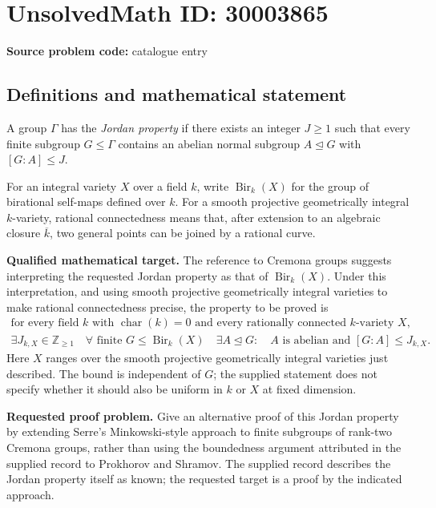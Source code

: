 \documentclass[11pt]{article}
\newcommand{\Z}{\mathbb{Z}}
\begin{document}
\section*{UnsolvedMath ID: 30003865}
\textbf{Source problem code:} catalogue entry
\subsection{Definitions and mathematical statement}
A group \(\Gamma\) has the \emph{Jordan property} if there exists an integer \(J\geq 1\) such that every finite subgroup \(G\leq\Gamma\) contains an abelian normal subgroup \(A\trianglelefteq G\) with \([G:A]\leq J\).

For an integral variety \(X\) over a field \(k\), write \(\operatorname{Bir}_k(X)\) for the group of birational self-maps defined over \(k\). For a smooth projective geometrically integral \(k\)-variety, rational connectedness means that, after extension to an algebraic closure \(\overline{k}\), two general points can be joined by a rational curve.

\textbf{Qualified mathematical target.} The reference to Cremona groups suggests interpreting the requested Jordan property as that of \(\operatorname{Bir}_k(X)\). Under this interpretation, and using smooth projective geometrically integral varieties to make rational connectedness precise, the property to be proved is
\[
\begin{gathered}
\text{for every field }k\text{ with }\operatorname{char}(k)=0
\text{ and every rationally connected }k\text{-variety }X,\\
\exists J_{k,X}\in\Z_{\geq1}\quad
\forall\text{ finite }G\leq\operatorname{Bir}_k(X)\quad
\exists A\trianglelefteq G:\quad
A\text{ is abelian and }[G:A]\leq J_{k,X}.
\end{gathered}
\]
Here \(X\) ranges over the smooth projective geometrically integral varieties just described. The bound is independent of \(G\); the supplied statement does not specify whether it should also be uniform in \(k\) or \(X\) at fixed dimension.

\textbf{Requested proof problem.} Give an alternative proof of this Jordan property by extending Serre's Minkowski-style approach to finite subgroups of rank-two Cremona groups, rather than using the boundedness argument attributed in the supplied record to Prokhorov and Shramov. The supplied record describes the Jordan property itself as known; the requested target is a proof by the indicated approach.
\end{document}

